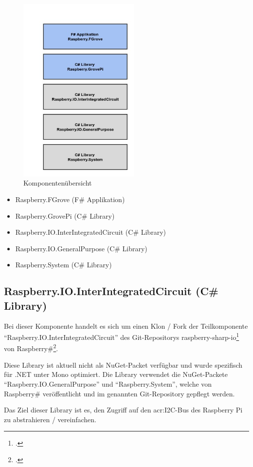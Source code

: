 \begin{figure}[H]
  \centering
  \includegraphics[width=6cm]{./images/Component-Overview}
  \caption{Komponentenübersicht}
\end{figure}

\begin{itemize}
\item Raspberry.FGrove (F\# Applikation)
\item Raspberry.GrovePi (C\# Library)
\item Raspberry.IO.InterIntegratedCircuit (C\# Library)
\item Raspberry.IO.GeneralPurpose (C\# Library)
\item Raspberry.System (C\# Library)
\end{itemize}


\subsection{Raspberry.IO.InterIntegratedCircuit (C\# Library)}
Bei dieser Komponente handelt es sich um einen Klon / Fork der Teilkomponente "`Raspberry.IO.InterIntegratedCircuit"' des Git-Repositorys raspberry-sharp-io\footcite{raspberry_io_i2c_2016-06-19}  von Raspberry\#\footcite{raspberry_sharp_2016-06-19}.

Diese Library ist aktuell nicht als NuGet-Packet verfügbar und wurde spezifisch für .NET unter Mono optimiert. Die Library verwendet die NuGet-Packete "`Raspberry.IO.GeneralPurpose"' und "`Raspberry.System"', welche von Raspberry\# veröffentlicht und im genannten Git-Repository gepflegt werden.

Das Ziel dieser Library ist es, den Zugriff auf den \gls{acr:I2C}-Bus des Raspberry Pi zu abstrahieren / vereinfachen.

